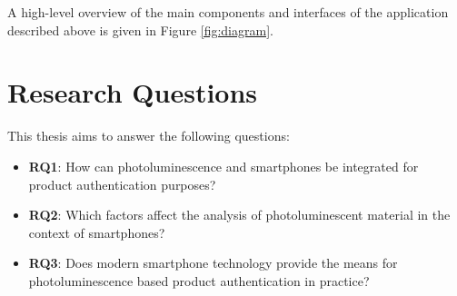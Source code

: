 \documentclass[thesis.tex]{subfiles}
\begin{document}
A high-level overview of the main components and interfaces of the application described above is given in Figure \ref{fig:diagram}.

\section{Research Questions}
\label{chapter:research-questions}

This thesis aims to answer the following questions:

\begin{itemize}
  \item \label{RQ1} \textbf{RQ1}: How can photoluminescence and smartphones be integrated for product authentication purposes?
  \item \label{RQ2} \textbf{RQ2}: Which factors affect the analysis of photoluminescent material in the context of smartphones?
  \item \label{RQ3} \textbf{RQ3}: Does modern smartphone technology provide the means for photoluminescence based product authentication in practice?
\end{itemize}
\end{document}
